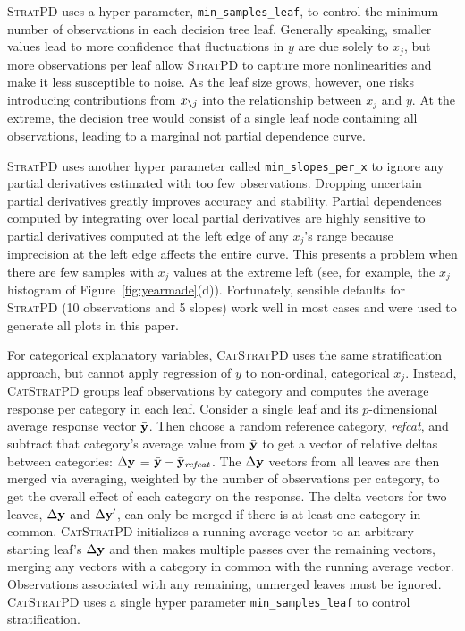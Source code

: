 \documentclass[]{article} %
\newcommand{\figref}[1]{Figure~\ref{#1}}
\newcommand{\spd}{\fontfamily{cmr}\textsc{\small StratPD}}
\newcommand{\cspd}{\fontfamily{cmr}\textsc{\small CatStratPD}}
\newcommand{\xnj}{$x_{\texttt{\char`\\} j}$}
\begin{document}
\spd{} uses a hyper parameter, {\tt\small min\_samples\_leaf}, to control the minimum number of observations in each decision tree leaf.  Generally speaking, smaller values lead to more confidence that fluctuations in $y$ are due solely to $x_j$, but more observations per leaf allow \spd{} to capture more nonlinearities and make it less susceptible to noise.  As the leaf size grows, however, one risks introducing contributions from \xnj{} into the relationship between $x_j$ and $y$. At the extreme, the decision tree would consist of a single leaf node containing all observations, leading to a marginal not partial dependence curve.

\spd{} uses another hyper parameter called {\tt\small min\_slopes\_per\_x} to ignore any partial derivatives estimated with too few observations.  Dropping uncertain partial derivatives greatly improves accuracy and stability. Partial dependences computed by integrating over local partial derivatives are highly sensitive to partial derivatives computed at the left edge of any $x_j$'s range because imprecision at the left edge affects the entire curve.  This presents a problem when there are few samples with $x_j$ values at the extreme left (see, for example, the $x_j$ histogram of \figref{fig:yearmade}(d)).  Fortunately, sensible defaults for \spd{} (10 observations and 5 slopes) work well in most cases and  were used to generate all plots in this paper.

For categorical explanatory variables, \cspd{} uses the same stratification approach, but cannot apply regression of $y$ to non-ordinal, categorical $x_j$. Instead, \cspd{} groups leaf observations by category and computes the average response per category in each leaf. Consider a single leaf and its  $p$-dimensional average response vector $\bar{\bf y}$. Then choose a random reference category, {\it refcat}, and subtract that category's  average value from $\bar{\bf y}$ to get a vector of relative deltas between categories: $\Delta {\bf y}$ = $\bar{\bf y} - \bar{\bf y}_{\it refcat}$. The $\Delta  {\bf y}$ vectors from all leaves are then merged via averaging, weighted by the number of observations per category, to get the overall effect of each category on the response.  The delta vectors for two leaves, $\Delta {\bf y}$ and $\Delta {\bf y}'$, can only be merged if there is at least one category in common.  \cspd{} initializes a running average vector to an arbitrary starting leaf's $\Delta  {\bf y}$ and then makes multiple passes over the remaining vectors, merging any vectors with a category in common with the running average vector.  Observations associated with any remaining, unmerged leaves must be ignored. \cspd{} uses a single hyper parameter {\tt\small min\_samples\_leaf} to control stratification. 
\end{document}
